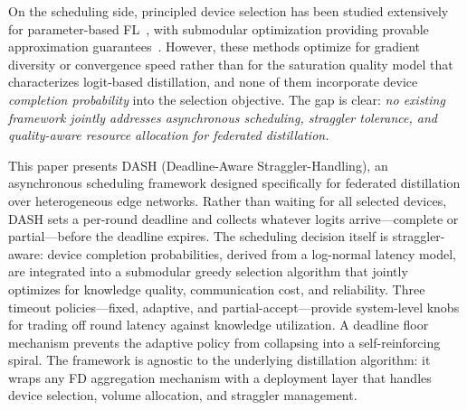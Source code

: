 \documentclass[a4paper,fleqn]{cas-dc}
\begin{document}
	On the scheduling side, principled device selection has been studied
	extensively for parameter-based
	FL~\citep{nishio_fedcs_2019, lai_oort_2021, balakrishnan_divfl_2022},
	with submodular optimization providing provable approximation
	guarantees~\citep{zhang_submod_tosn_2024}.  However, these methods
	optimize for gradient diversity or convergence speed rather than for
	the saturation quality model that characterizes logit-based
	distillation, and none of them incorporate device \emph{completion
		probability} into the selection objective.  The gap is clear:
	\emph{no existing framework jointly addresses asynchronous scheduling,
		straggler tolerance, and quality-aware resource allocation for
		federated distillation.}
	
	This paper presents DASH (Deadline-Aware Straggler-Handling), an
	asynchronous scheduling framework designed specifically for federated
	distillation over heterogeneous edge networks.  Rather than waiting
	for all selected devices, DASH sets a per-round deadline and collects
	whatever logits arrive---complete or partial---before the deadline
	expires.  The scheduling decision itself is straggler-aware: device
	completion probabilities, derived from a log-normal latency model,
	are integrated into a submodular greedy selection algorithm that
	jointly optimizes for knowledge quality, communication cost, and
	reliability.  Three timeout policies---fixed, adaptive, and
	partial-accept---provide system-level knobs for trading off round
	latency against knowledge utilization.  A deadline floor mechanism
	prevents the adaptive policy from collapsing into a self-reinforcing
	spiral.  The framework is agnostic to the underlying distillation
	algorithm: it wraps any FD aggregation mechanism with a deployment
	layer that handles device selection, volume allocation, and straggler
	management.
	
\end{document}
